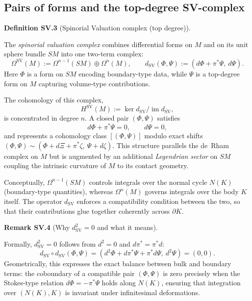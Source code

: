\documentclass[10pt, letterpaper]{article}
\newcommand{\CustomHeading}[3]{%
  \par\medskip\noindent%
  \textbf{#1 #2} \textnormal{(#3)}.\enskip%
}
\newenvironment{DEF}[2]{\begin{unitbox}\CustomHeading{Definition}{#1}{#2}}{\end{unitbox}}
\newenvironment{REM}[2]{\begin{unitbox}\CustomHeading{Remark}{#1}{#2}}{\end{unitbox}}
\begin{document}
\subsection{Pairs of forms and the top-degree SV-complex}
\begin{DEF}{SV.3}{Spinorial Valuation complex (top degree)}
The \emph{spinorial valuation complex} combines differential forms on $M$ and on its unit sphere bundle $SM$ into one two-term complex:
\[
\Omega^{\operatorname{SV}}(M):=\Omega^{n-1}(SM)\oplus\Omega^n(M),
\qquad
d_{\operatorname{SV}}(\Phi,\Psi):=(d\Phi+\pi^*\Psi,\ d\Psi).
\]
Here $\Phi$ is a form on $SM$ encoding boundary-type data, while $\Psi$ is a top-degree form on $M$ capturing volume-type contributions.

The cohomology of this complex,
\[
H^{\operatorname{SV}}(M):=\ker d_{\operatorname{SV}} / \operatorname{im} d_{\operatorname{SV}},
\]
is concentrated in degree $n$. A closed pair $(\Phi,\Psi)$ satisfies
\[
d\Phi+\pi^*\Psi=0, \qquad d\Psi=0,
\]
and represents a cohomology class $[(\Phi,\Psi)]$ modulo exact shifts
$(\Phi,\Psi)\sim(\Phi+d\Xi+\pi^*\zeta,\ \Psi+d\zeta)$.
This structure parallels the de~Rham complex on $M$ but is augmented by an additional \emph{Legendrian sector} on $SM$ coupling the intrinsic curvature of $M$ to its contact geometry.

Conceptually, $\Omega^{n-1}(SM)$ controls integrals over the normal cycle $N(K)$ (boundary-type quantities), whereas $\Omega^n(M)$ governs integrals over the body $K$ itself. The operator $d_{\operatorname{SV}}$ enforces a compatibility condition between the two, so that their contributions glue together coherently across $\partial K$.
\end{DEF}

\begin{REM}{SV.4}{Why $d_{\operatorname{SV}}^2=0$ and what it means}
Formally, $d_{\operatorname{SV}}^2=0$ follows from $d^2=0$ and $d\pi^*=\pi^*d$:
\[
d_{\operatorname{SV}}\!\circ d_{\operatorname{SV}}(\Phi,\Psi)
=(d^2\Phi+d\pi^*\Psi+\pi^*d\Psi,\ d^2\Psi)=(0,0).
\]
Geometrically, this expresses the exact balance between bulk and boundary terms:
the coboundary of a compatible pair $(\Phi,\Psi)$ is zero precisely when the Stokes-type relation
$d\Phi=-\pi^*\Psi$ holds along $N(K)$, ensuring that integration over $(N(K),K)$ is invariant under infinitesimal deformations.
\end{REM}
\end{document}
